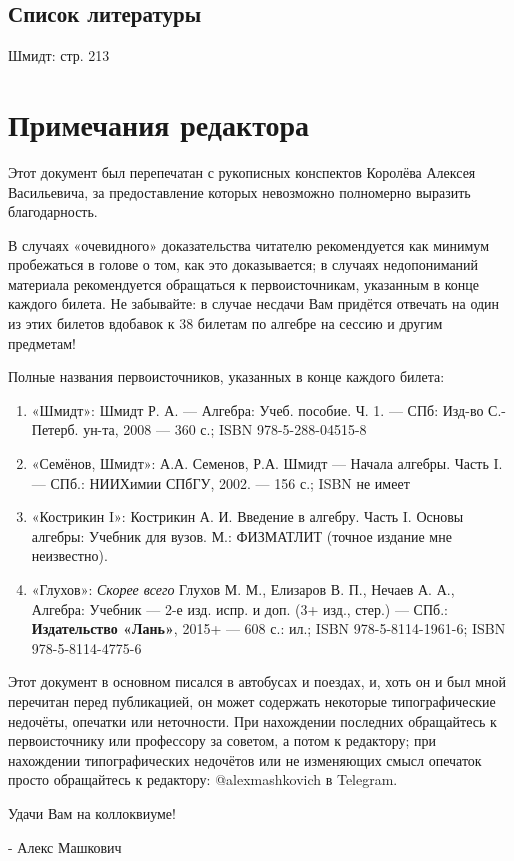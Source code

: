 \documentclass{article}
\begin{document}
\subsection*{Список литературы}
Шмидт: стр. 213


\newpage
\section{Примечания редактора}
Этот документ был перепечатан с рукописных конспектов Королёва Алексея Васильевича, за предоставление которых невозможно полномерно выразить благодарность.

В случаях «очевидного» доказательства читателю рекомендуется как минимум пробежаться в голове о том, как это доказывается; в случаях недопониманий материала рекомендуется обращаться к первоисточникам, указанным в конце каждого билета. Не забывайте: в случае несдачи Вам придётся отвечать на один из этих билетов вдобавок к 38 билетам по алгебре на сессию и другим предметам!

Полные названия первоисточников, указанных в конце каждого билета:
\begin{enumerate}
\item «Шмидт»: Шмидт Р. А. --- Алгебра: Учеб. пособие. Ч. 1. --- СПб: Изд-во С.-Петерб. ун-та, 2008 --- 360 с.; ISBN 978-5-288-04515-8
\item «Семёнов, Шмидт»: А.А. Семенов, Р.А. Шмидт --- Начала алгебры. Часть I. --- СПб.: НИИХимии СПбГУ, 2002. --- 156 с.; ISBN не имеет
\item «Кострикин I»: Кострикин А. И. Введение в алгебру. Часть I. Основы алгебры: Учебник для вузов. М.: ФИЗМАТЛИТ (точное издание мне неизвестно).
\item «Глухов»: \textit{Скорее всего} Глухов М. М., Елизаров В. П., Нечаев А. А., Алгебра: Учебник --- 2-е изд. испр. и доп. (3+ изд., стер.) --- СПб.: \textbf{Издательство «Лань»}, 2015+ --- 608 с.: ил.; ISBN 978-5-8114-1961-6; ISBN 978-5-8114-4775-6
\end{enumerate}

Этот документ в основном писался в автобусах и поездах, и, хоть он и был мной перечитан перед публикацией, он может содержать некоторые типографические недочёты, опечатки или неточности. При нахождении последних обращайтесь к первоисточнику или профессору за советом, а потом к редактору; при нахождении типографических недочётов или не изменяющих смысл опечаток просто обращайтесь к редактору: @alexmashkovich в Telegram.

Удачи Вам на коллоквиуме!

\hspace*{\fill} - Алекс Машкович
\end{document}
